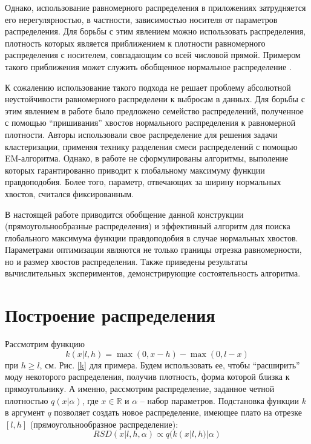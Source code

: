 \documentclass[12pt]{article}
\theoremstyle{definition}
\theoremstyle{plain}
\begin{document}
Однако, использование равномерного распределения в приложениях затрудняется
его нерегулярностью, в частности, зависимостью носителя от 
параметров распределения. Для борьбы с этим явлением можно использовать
распределения, плотность которых является приближением к 
плотности равномерного распределения с носителем,
совпадающим со всей числовой прямой. Примером такого приближения 
может служить обобщенное нормальное распределение \cite{Mahesh1989}. 

К сожалению использование такого подхода не решает проблему
абсолютной неустойчивости равномерного распределени к выбросам
в данных. Для борьбы с этим явлением в работе \cite{Pelleg2001} было предложено 
семейство распределений, полученное с помощью ``пришивания'' 
хвостов нормального распределения к равномерной плотности. Авторы
использовали свое распределение для решения задачи кластеризации,
применяя технику разделения смеси распределений с помощью
EM-алгоритма. Однако, в работе не сформулированы алгоритмы, 
выполение которых гарантированно приводит к глобальному максимуму
функции правдоподобия. Более того, параметр, 
отвечающих за ширину нормальных хвостов, считался фиксированным.

В настоящей работе приводится обобщение данной конструкции 
(прямоугольнообразные распределения) и
эффективный алгоритм для поиска глобального максимума 
функции правдоподобия в случае нормальных хвостов. Параметрами
оптимизации являются не только границы отрезка равномерности, но и размер
хвостов распределения. Также приведены результаты вычислительных 
экспериментов, демонстрирующие состоятельность алгоритма.


\section{Построение распределения}

Рассмотрим функцию
$$
k(x | l, h) = \max(0, x - h) - \max(0, l - x)
$$
при $h \geq l$, см. Рис. \ref{k} для примера. Будем использовать ее, чтобы 
``расширить'' моду некоторого распределения, получив плотность, форма которой 
близка к прямоугольнику. А именно, рассмотрим распределение, заданное четной 
плотностью $q(x | \alpha)$, где $x \in \mathbb{R}$ и $\alpha$ -- набор параметров.
Подстановка функции $k$ в аргумент $q$ позволяет создать новое 
распределение, имеющее плато на отрезке $[l, h]$ (прямоугольнообразное распределение):
$$
RSD(x | l, h, \alpha) \propto q(k(x | l, h) | \alpha)
$$
\end{document}
